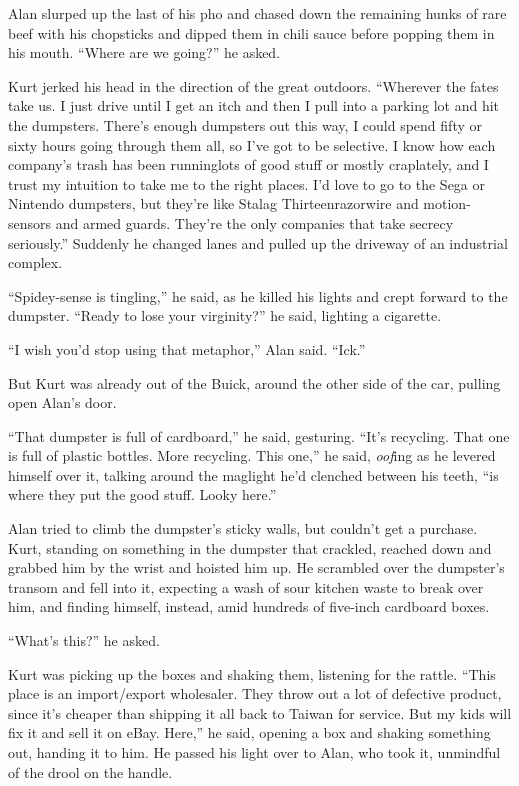 Alan slurped up the last of his pho and chased down the remaining
hunks of rare beef with his chopsticks and dipped them in chili sauce
before popping them in his mouth.  ``Where are we going?'' he asked.

Kurt jerked his head in the direction of the great outdoors. 
``Wherever the fates take us.  I just drive until I get an itch and
then I pull into a parking lot and hit the dumpsters.  There's enough
dumpsters out this way, I could spend fifty or sixty hours going
through them all, so I've got to be selective.  I know how each
company's trash has been running\dash{}lots of good stuff or mostly
crap\dash{}lately, and I trust my intuition to take me to the right
places.  I'd love to go to the Sega or Nintendo dumpsters, but they're
like Stalag Thirteen\dash{}razorwire and motion-sensors and armed guards. 
They're the only companies that take secrecy seriously.'' Suddenly he
changed lanes and pulled up the driveway of an industrial complex.

``Spidey-sense is tingling,'' he said, as he killed his lights and
crept forward to the dumpster.  ``Ready to lose your virginity?'' he
said, lighting a cigarette.

``I wish you'd stop using that metaphor,'' Alan said.  ``Ick.''

But Kurt was already out of the Buick, around the other side of the
car, pulling open Alan's door.

``That dumpster is full of cardboard,'' he said, gesturing.  ``It's
recycling.  That one is full of plastic bottles.  More recycling. 
This one,'' he said, \textit{oof}ing as he levered himself over it,
talking around the maglight he'd clenched between his teeth, ``is
where they put the good stuff.  Looky here.''

Alan tried to climb the dumpster's sticky walls, but couldn't get a
purchase.  Kurt, standing on something in the dumpster that crackled,
reached down and grabbed him by the wrist and hoisted him up.  He
scrambled over the dumpster's transom and fell into it, expecting a
wash of sour kitchen waste to break over him, and finding himself,
instead, amid hundreds of five-inch cardboard boxes.

``What's this?'' he asked.

Kurt was picking up the boxes and shaking them, listening for the
rattle.  ``This place is an import/export wholesaler.  They throw out
a lot of defective product, since it's cheaper than shipping it all
back to Taiwan for service.  But my kids will fix it and sell it on
eBay.  Here,'' he said, opening a box and shaking something out,
handing it to him.  He passed his light over to Alan, who took it,
unmindful of the drool on the handle.

